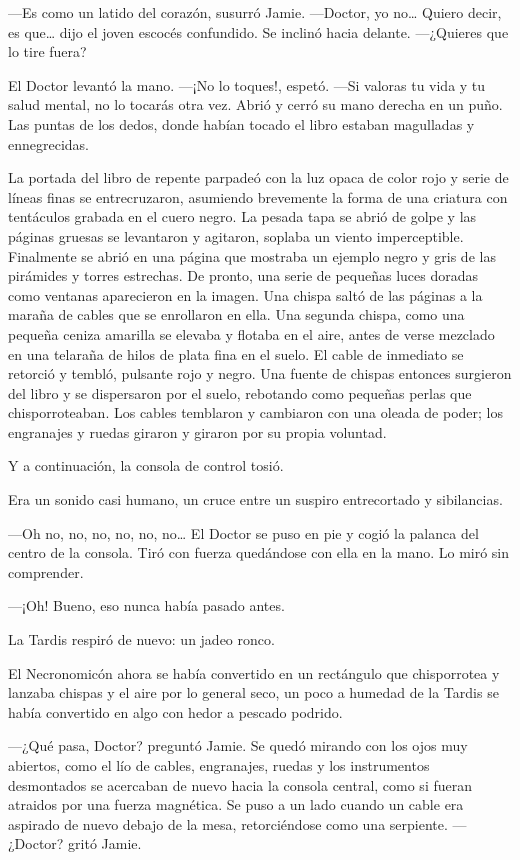 ---Es como un latido del corazón, susurró Jamie. ---Doctor, yo
no\ldots{} Quiero decir, es que\ldots{} dijo el joven escocés
confundido. Se inclinó hacia delante. ---¿Quieres que lo tire  fuera?

El Doctor levantó la mano. ---¡No lo toques!, espetó. ---Si valoras tu
vida y tu salud mental, no lo tocarás otra vez. Abrió y cerró su mano
derecha en un puño. Las puntas de los dedos, donde habían tocado el
libro estaban magulladas y ennegrecidas.

La portada del libro de repente parpadeó con la luz opaca de color rojo
y serie de líneas finas se entrecruzaron, asumiendo brevemente la forma
de una criatura con tentáculos grabada en el cuero negro. La pesada tapa
se abrió de golpe y las páginas gruesas se levantaron y agitaron,
soplaba un viento imperceptible. Finalmente se abrió en una página que
mostraba un ejemplo negro y gris de las pirámides y torres estrechas. De
pronto, una serie de pequeñas luces doradas como ventanas aparecieron en
la imagen. Una chispa saltó de las páginas a la maraña de cables que se
enrollaron en ella. Una segunda chispa, como una pequeña ceniza amarilla
se elevaba y flotaba en el aire, antes de verse mezclado en una telaraña
de hilos de plata fina en el suelo. El cable de inmediato se retorció y
tembló, pulsante rojo y negro. Una fuente de chispas entonces surgieron
del libro y se dispersaron por el suelo, rebotando como pequeñas perlas
que chisporroteaban. Los cables temblaron y cambiaron con una oleada de
poder; los engranajes y ruedas giraron y giraron por su propia voluntad.

Y a continuación, la consola de control tosió.

Era un sonido casi humano, un cruce entre un suspiro entrecortado y
sibilancias.

---Oh no, no, no, no, no, no\ldots{} El Doctor se puso en pie y cogió la
palanca del centro de la consola. Tiró con fuerza quedándose con ella en
la mano. Lo miró sin comprender.

---¡Oh! Bueno, eso nunca había pasado antes.

La Tardis respiró de nuevo: un jadeo ronco.

El Necronomicón ahora se había convertido en un rectángulo que
chisporrotea y lanzaba  chispas y el aire por lo general seco, un poco a
humedad de la Tardis se había convertido en algo con hedor a pescado
podrido.

---¿Qué pasa, Doctor? preguntó Jamie. Se quedó mirando con los ojos muy
abiertos, como el lío de cables, engranajes, ruedas y los instrumentos
desmontados se acercaban de nuevo hacia la consola central, como si
fueran atraidos por una fuerza magnética. Se puso a un lado cuando un
cable era aspirado de nuevo debajo de la mesa, retorciéndose como una
serpiente. ---¿Doctor? gritó Jamie.

